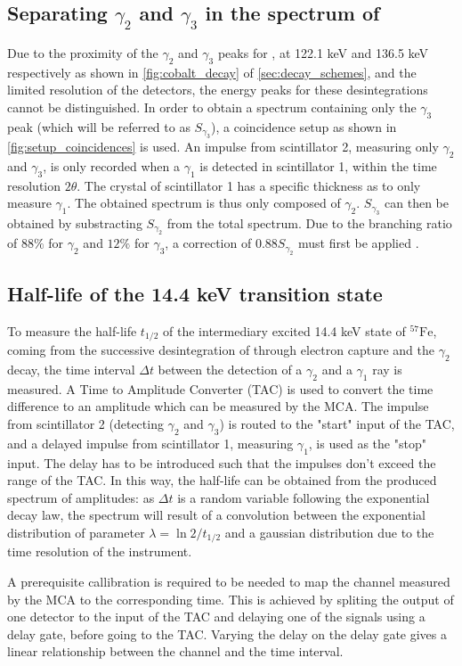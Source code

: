 \subsection{Separating \(\gamma_2\) and \(\gamma_3\) in the spectrum of \cobalt}
\label{sec:separation}

Due to the proximity of the \(\gamma_2\) and \(\gamma_3\) peaks for \cobalt, at 122.1 keV and 136.5 keV respectively as shown in \autoref{fig:cobalt_decay} of \autoref{sec:decay_schemes}, and the limited resolution of the detectors, the energy peaks for these desintegrations cannot be distinguished. In order to obtain a spectrum containing only the \(\gamma_3\) peak (which will be referred to as \(S_{\gamma_3}\)), a coincidence setup as shown in \autoref{fig:setup_coincidences} is used. An impulse from scintillator 2, measuring only \(\gamma_2\) and \(\gamma_3\), is only recorded when a \(\gamma_1\) is detected in scintillator 1, within the time resolution \(2\theta\). The crystal of scintillator 1 has a specific thickness as to only measure \(\gamma_1\). The obtained spectrum is thus only composed of \(\gamma_2\). \(S_{\gamma_3}\) can then be obtained by substracting \(S_{\gamma_2}\) from the total spectrum. Due to the branching ratio of  \(88\%\) for \(\gamma_2\) and \(12\%\) for \(\gamma_3\), a correction of \(0.88 S_{\gamma_2}\) must first be applied \cite{notice_VI}.


\subsection{Half-life of the 14.4 keV transition state}
\label{sec:half_life}

To measure the half-life $t_{1/2}$ of the intermediary excited 14.4 keV state of \(^{57}\textrm{Fe}\), coming from the successive desintegration of \cobalt through electron capture and the \(\gamma_2\) decay, the time interval $\Delta t$ between the detection of a \(\gamma_2\) and a \(\gamma_1\) ray is measured. A Time to Amplitude Converter (TAC) is used to convert the time difference to an amplitude which can be measured by the MCA. The impulse from scintillator 2 (detecting \(\gamma_2\) and \(\gamma_3\)) is routed to the "start" input of the TAC, and a delayed impulse from scintillator 1, measuring \(\gamma_1\), is used as the "stop" input. The delay has to be introduced such that the impulses don't exceed the range of the TAC.
In this way, the half-life can be obtained from the 
produced spectrum of amplitudes: as $\Delta t$ is a 
random variable following the exponential decay law, 
the spectrum will result of a convolution
between the exponential distribution of parameter
$\lambda = \ln{2} / t_{1/2}$ and a gaussian distribution 
due to the time resolution  of the instrument.

A prerequisite callibration is required to be needed to map the channel measured by the MCA to the corresponding time. This is achieved by spliting the output of one detector to the input of the TAC and delaying one of the signals using a delay gate, before going to the TAC. Varying the delay on the delay gate gives a linear relationship between the channel and the time interval.
